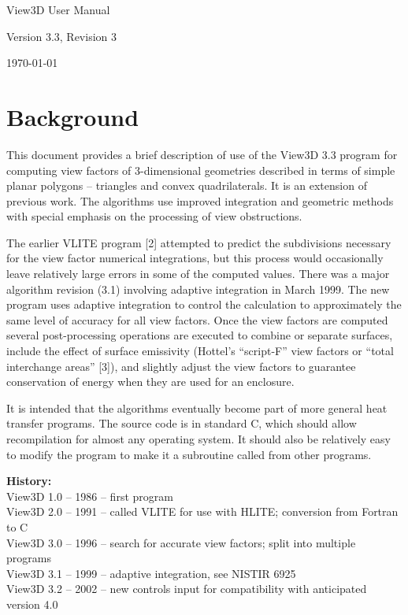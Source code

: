 \documentclass[10pt]{article}
\begin{document}
\begin{titlepage}
\begin{center}
\begin{Huge}
View3D User Manual\\
\end{Huge}
\vspace{1cm}
\begin{Large}
Version 3.3, Revision 3\\
\end{Large}
\vspace{1cm}
\begin{Large}
\today
\end{Large}
\end{center}
\end{titlepage}
\section{Background}
This document provides a brief description of use of the View3D 3.3 program for
computing view factors of 3-dimensional geometries described in terms of simple
planar polygons – triangles and convex quadrilaterals. It is an extension of
previous work. The algorithms use improved integration and geometric methods 
with special emphasis on the processing of view obstructions. 

The earlier VLITE program [2] attempted to predict the subdivisions necessary
for the view factor numerical integrations, but this process would occasionally
leave relatively large errors in some of the computed values. There was a major
algorithm revision (3.1) involving adaptive integration in March 1999.  The new
program uses adaptive integration to control the calculation to approximately 
the same level of accuracy for all view factors. Once the view factors are
computed several post-processing operations are executed to combine or separate
surfaces, include the effect of surface emissivity (Hottel's ``script-F'' view
factors or ``total interchange areas'' [3]), and slightly adjust the view 
factors to guarantee conservation of energy when they are used for an enclosure.

It is intended that the algorithms eventually become part of more general heat
transfer programs. The source code is in standard C, which should allow
recompilation for almost any operating system. It should also be relatively 
easy to modify the program to make it a subroutine called from other programs.

\noindent
\textbf{History:}\\
View3D 1.0 -- 1986 -- first program\\
View3D 2.0 -- 1991 -- called VLITE for use with HLITE; conversion from
Fortran to C\\
View3D 3.0 -- 1996 -- search for accurate view factors; split into multiple
programs\\
View3D 3.1 -- 1999 -- adaptive integration, see NISTIR 6925\\
View3D 3.2 -- 2002 -- new controls input for compatibility with anticipated
version 4.0\\
\end{document}
